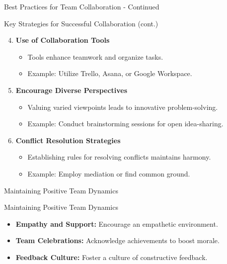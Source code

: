 \documentclass[aspectratio=169]{beamer}
\begin{document}
\begin{frame}[fragile]{Best Practices for Team Collaboration - Continued}
    \begin{block}{Key Strategies for Successful Collaboration (cont.)}
        \begin{enumerate}
            \setcounter{enumii}{3} %
            \item \textbf{Use of Collaboration Tools}
            \begin{itemize}
                \item Tools enhance teamwork and organize tasks.
                \item Example: Utilize Trello, Asana, or Google Workspace.
            \end{itemize}

            \item \textbf{Encourage Diverse Perspectives}
            \begin{itemize}
                \item Valuing varied viewpoints leads to innovative problem-solving.
                \item Example: Conduct brainstorming sessions for open idea-sharing.
            \end{itemize}

            \item \textbf{Conflict Resolution Strategies}
            \begin{itemize}
                \item Establishing rules for resolving conflicts maintains harmony.
                \item Example: Employ mediation or find common ground.
            \end{itemize}
        \end{enumerate}
    \end{block}
\end{frame}

\begin{frame}[fragile]{Maintaining Positive Team Dynamics}
    \begin{block}{Maintaining Positive Team Dynamics}
        \begin{itemize}
            \item \textbf{Empathy and Support:} Encourage an empathetic environment.
            \item \textbf{Team Celebrations:} Acknowledge achievements to boost morale.
            \item \textbf{Feedback Culture:} Foster a culture of constructive feedback.
        \end{itemize}
    \end{block}
\end{frame}
\end{document}
